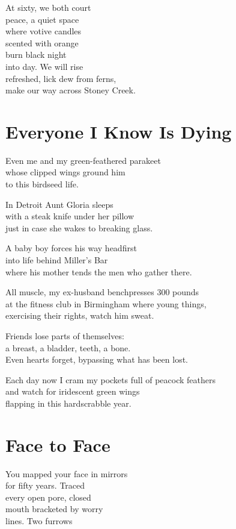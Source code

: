 \documentclass[twoside,10pt]{book}
\begin{document}
At sixty, we both court\\
peace, a quiet space\\
where votive candles\\
scented with orange\\
burn black night\\
into day. We will rise\\
refreshed, lick dew from ferns,\\
make our way across Stoney Creek.


\clearpage
\section{Everyone I Know Is Dying}

Even me and my green-feathered parakeet\\
whose clipped wings ground him\\
to this birdseed life.

In Detroit Aunt Gloria sleeps\\
with a steak knife under her pillow\\
just in case she wakes to breaking glass.

A baby boy forces his way headfirst\\
into life behind Miller's Bar\\
where his mother tends the men who gather there.

All muscle, my ex-husband benchpresses 300 pounds\\
at the fitness club in Birmingham where young things,\\
exercising their rights, watch him sweat.

Friends lose parts of themselves:\\
a breast, a bladder, teeth, a bone.\\
Even hearts forget, bypassing what has been lost.

Each day now I cram my pockets full of peacock feathers\\
and watch for iridescent green wings\\
flapping in this hardscrabble year.


\clearpage
\section{Face to Face}

You mapped your face in mirrors\\
for fifty years. Traced\\
every open pore, closed\\
mouth bracketed by worry\\
lines. Two furrows
\end{document}
